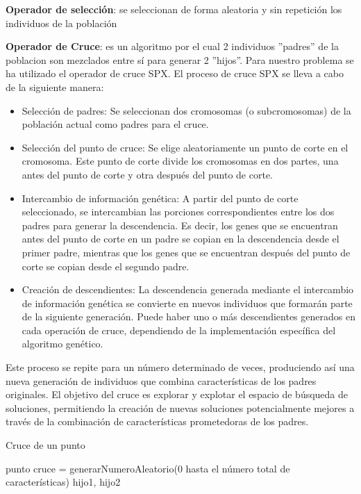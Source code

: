 \textbf{Operador de selección}: se seleccionan de forma aleatoria y sin repetición los individuos de la población

\textbf{Operador de Cruce}: es un algoritmo por el cual 2 individuos ''padres'' de la poblacion son mezclados entre sí para generar 2 ''hijos''. Para nuestro problema se ha utilizado el operador de cruce SPX. El proceso de cruce SPX se lleva a cabo de la siguiente manera:

\begin{itemize}
	\item Selección de padres: Se seleccionan dos cromosomas (o subcromosomas) de la población actual como padres para el cruce.
	\item Selección del punto de cruce: Se elige aleatoriamente un punto de corte en el cromosoma. Este punto de corte divide los cromosomas en dos partes, una antes del punto de corte y otra después del punto de corte.
	\item Intercambio de información genética: A partir del punto de corte seleccionado, se intercambian las porciones correspondientes entre los dos padres para generar la descendencia. Es decir, los genes que se encuentran antes del punto de corte en un padre se copian en la descendencia desde el primer padre, mientras que los genes que se encuentran después del punto de corte se copian desde el segundo padre.
	\item Creación de descendientes: La descendencia generada mediante el intercambio de información genética se convierte en nuevos individuos que formarán parte de la siguiente generación. Puede haber uno o más descendientes generados en cada operación de cruce, dependiendo de la implementación específica del algoritmo genético.
\end{itemize}

Este proceso se repite para un número determinado de veces, produciendo así una nueva generación de individuos que combina características de los padres originales. El objetivo del cruce es explorar y explotar el espacio de búsqueda de soluciones, permitiendo la creación de nuevas soluciones potencialmente mejores a través de la combinación de características prometedoras de los padres.


\begin{algorithm}[H]
	\caption{Cruce de un punto}
	
	
	\BlankLine
	\BlankLine
	punto cruce = generarNumeroAleatorio(0 hasta el número total de características)\;
	\BlankLine
	\Return hijo1, hijo2\;
	
\end{algorithm}
\quad\\


